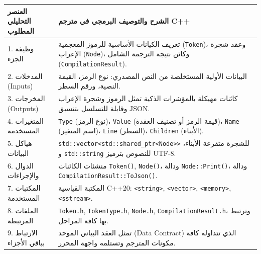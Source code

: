 \documentclass[11pt,a4paper,oneside]{report}
\begin{document}
\begin{longtable}{|p{4.2cm}|p{12.2cm}|}
\hline
\rowcolor{NavyBlue}\color{white}\textbf{\arabicfont العنصر التحليلي المطلوب} & \rowcolor{NavyBlue}\color{white}\textbf{\arabicfont الشرح والتوصيف البرمجي في مترجم C++} \\
\hline
\endhead
1. وظيفة الجزء & تعريف الكيانات الأساسية للرموز المعجمية (\texttt{Token})، وعقد شجرة الإعراب (\texttt{Node})، وكائن نتيجة الترجمة الشامل (\texttt{CompilationResult}). \\
\hline
2. المدخلات (Inputs) & البيانات الأولية المستخلصة من النص المصدري: نوع الرمز، القيمة النصية، ورقم السطر. \\
\hline
3. المخرجات (Outputs) & كائنات مهيكلة بالمؤشرات الذكية تمثل الرموز وشجرة الإعراب وقابلة للتسلسل بتنسيق JSON. \\
\hline
4. المتغيرات المستخدمة & \texttt{Type} (نوع الرمز)، \texttt{Value} (قيمة الرمز أو تصنيف العقدة)، \texttt{Name} (اسم المتغير)، \texttt{Line} (السطر)، \texttt{Children} (الأبناء). \\
\hline
5. هياكل البيانات & \texttt{std::vector<std::shared\_ptr<Node>>} للشجرة متفرعة الأبناء، و \texttt{std::string} للنصوص بترميز UTF-8. \\
\hline
6. الدوال والإجراءات & منشئات الكائنات \texttt{Token()}, \texttt{Node()}، ودالة \texttt{Node::Print()}، ودالة \texttt{CompilationResult::ToJson()}. \\
\hline
7. المكتبات المستخدمة & المكتبة القياسية C++20: \texttt{<string>}, \texttt{<vector>}, \texttt{<memory>}, \texttt{<sstream>}. \\
\hline
8. الملفات المرتبطة & \texttt{Token.h}, \texttt{TokenType.h}, \texttt{Node.h}, \texttt{CompilationResult.h}، وترتبط بها كافة المراحل. \\
\hline
9. الارتباط بباقي الأجزاء & تمثل العقد البياني الموحد (Data Contract) الذي تتداوله كافة مكونات المترجم وتستلمه واجهة المحرر. \\
\hline
\end{longtable}
\end{document}

